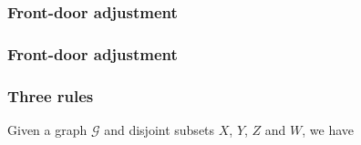 \documentclass{beamer}
\begin{document}
\begin{frame}
    \frametitle{Front-door adjustment}
\end{frame}

\begin{frame}
    \frametitle{Front-door adjustment}
\end{frame}

\begin{frame}
    \frametitle{Three rules}
    \begin{flushleft}
        Given a graph $\mathcal{G}$ and disjoint subsets $X$, $Y$, $Z$ and $W$, we have
    \end{flushleft}
\end{frame}
\end{document}
